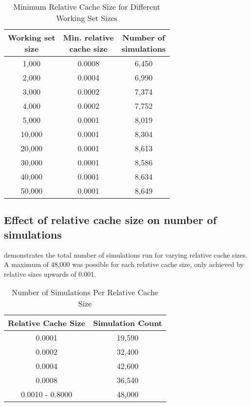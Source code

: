 \begin{table}[h!]
    \centering
    \caption{Minimum Relative Cache Size for Different Working Set Sizes}
    \label{tab: min_relative_cache_size}
    \begin{tabular}{ccc}
        \toprule
        \makecell{\textbf{Working set} \\ \textbf{size}} & \makecell{\textbf{Min. relative} \\ \textbf{cache size}} & \makecell{\textbf{Number of} \\ \textbf{simulations}} \\
        \midrule
        1,000 & 0.0008 & 6,450 \\
        2,000 & 0.0004 & 6,990\\
        3,000 & 0.0002 & 7,374 \\
        4,000 & 0.0002 & 7,752 \\
        5,000 & 0.0001 & 8,019 \\
        10,000 & 0.0001 & 8,304 \\
        20,000 & 0.0001 & 8,613 \\
        30,000 & 0.0001 & 8,586 \\
        40,000 & 0.0001 & 8,634 \\
        50,000 & 0.0001 & 8,649 \\
        \bottomrule
    \end{tabular}
\end{table}

\subsection{Effect of relative cache size on number of simulations}\label{appendix:relative-cache-size-simulations}

 demonstrates the total number of simulations run for varying relative cache sizes. A maximum of 48,000 was possible for each relative cache size, only achieved by relative sizes upwards of 0.001.

\begin{table}[h!]
    \centering
    \caption{Number of Simulations Per Relative Cache Size}
    \label{tab:data_size}
    \begin{tabular}{cc}
        \toprule
        \textbf{Relative Cache Size} & \textbf{Simulation Count} \\
        \midrule
        0.0001 & 19,590 \\
        0.0002 & 32,400 \\
        0.0004 & 42,600 \\
        0.0008 & 36,540 \\
        0.0010 - 0.8000 & 48,000 \\
        \bottomrule
    \end{tabular}
\end{table}






